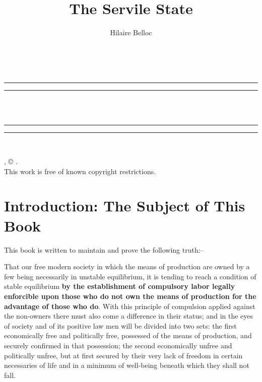 \documentclass{book}
\date{}
\title{The Servile State}
\author{Hilaire Belloc}
\begin{document}
\makeatletter
\renewcommand{\@chapapp}{Section}
\makeatother
\thispagestyle{empty}
\begin{center}
	{\Huge \@title   \\[5mm]}
\end{center}
\newpage
\thispagestyle{empty}
\cleardoublepage
\begin{center}
	\thispagestyle{empty}
	\vspace*{\baselineskip}
	\rule{\textwidth}{1.6pt}\vspace*{-\baselineskip}\vspace*{2pt}
	\rule{\textwidth}{0.4pt}\\[\baselineskip]
	{\Huge\scshape \@title   \\[5mm]}
	{\Large }
	\rule{\textwidth}{0.4pt}\vspace*{-\baselineskip}\vspace{3.2pt}
	\rule{\textwidth}{1.6pt}\\[\baselineskip]
	\vspace*{4\baselineskip}
	{\Large \@author}
	\vfill
\end{center}
\pagebreak
\newpage
\thispagestyle{empty}
\null\vfill
\noindent
\begin{center}
	{\emph{\@title}, © \@author.\\[5mm]}
	{This work is free of known copyright restrictions.\\[5mm]}
\end{center}
\pagebreak
\newpage
\setcounter{tocdepth}{0}
\setcounter{secnumdepth}{0}
\chapter*{Introduction: The Subject of This Book}
\label{chapter-0}
This book is written to maintain and prove the following truth:–

That our free modern society in which the means of production are owned by a few being necessarily in unstable equilibrium, it is tending to reach a condition of stable equilibrium \textbf{by the establishment of compulsory labor legally enforcible upon those who do not own the means of production for the advantage of those who do}. With this principle of compulsion applied against the non-owners there must also come a difference in their status; and in the eyes of society and of its positive law men will be divided into two sets: the first economically free and politically free, possessed of the means of production, and securely confirmed in that possession; the second economically unfree and politically unfree, but at first secured by their very lack of freedom in certain necessaries of life and in a minimum of well-being beneath which they shall not fall.
\end{document}
